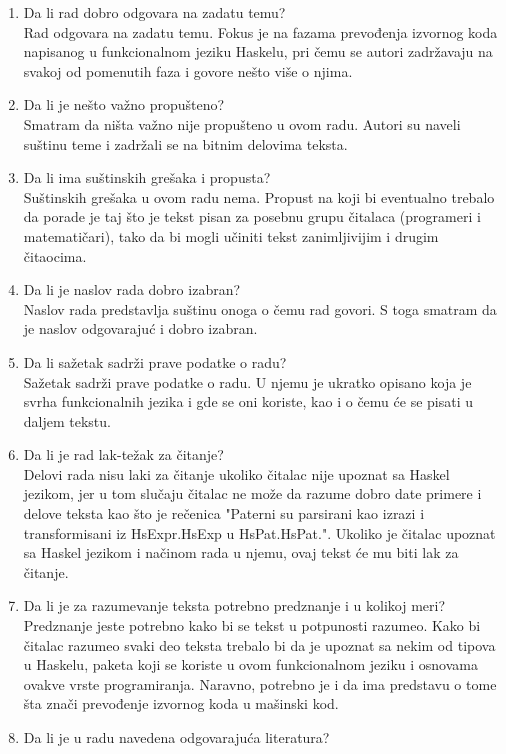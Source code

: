 \documentclass[a4paper]{report}
\begin{document}
	\begin{enumerate}
		\item Da li rad dobro odgovara na zadatu temu?\\
		Rad odgovara na zadatu temu. Fokus je na fazama prevođenja izvornog koda napisanog u funkcionalnom jeziku Haskelu, pri čemu se autori zadržavaju na svakoj od pomenutih faza i govore nešto više o njima.
		\item Da li je nešto važno propušteno?\\
		Smatram da ništa važno nije propušteno u ovom radu. Autori su naveli suštinu teme i zadržali se na bitnim delovima teksta.
		\item Da li ima suštinskih grešaka i propusta?\\
		Suštinskih grešaka u ovom radu nema. Propust na koji bi eventualno trebalo da porade je taj što je tekst pisan za posebnu grupu čitalaca (programeri i matematičari), tako da bi mogli učiniti tekst zanimljivijim i drugim čitaocima.
		\item Da li je naslov rada dobro izabran?\\
		Naslov rada predstavlja suštinu onoga o čemu rad govori. S toga smatram da je naslov odgovarajuć i dobro izabran.
		\item Da li sažetak sadrži prave podatke o radu?\\
		Sažetak sadrži prave podatke o radu. U njemu je ukratko opisano koja je svrha funkcionalnih jezika i gde se oni koriste, kao i o čemu će se pisati u daljem tekstu.
		\item Da li je rad lak-težak za čitanje?\\
		Delovi rada nisu laki za čitanje ukoliko čitalac nije upoznat sa Haskel jezikom, jer u tom slučaju čitalac ne može da razume dobro date primere i delove teksta kao što je rečenica "Paterni su parsirani kao izrazi i transformisani iz HsExpr.HsExp u
		HsPat.HsPat.". Ukoliko je čitalac upoznat sa Haskel jezikom i načinom rada u njemu, ovaj tekst će mu biti lak za čitanje.
		\item Da li je za razumevanje teksta potrebno predznanje i u kolikoj meri?\\
		Predznanje jeste potrebno kako bi se tekst u potpunosti razumeo. Kako bi čitalac razumeo svaki deo teksta trebalo bi da je upoznat sa nekim od tipova u Haskelu, paketa koji se koriste u ovom funkcionalnom jeziku i osnovama ovakve vrste programiranja. Naravno, potrebno je i da ima predstavu o tome šta znači prevođenje izvornog koda u mašinski kod.
		\item Da li je u radu navedena odgovarajuća literatura?\\

\end{enumerate}
\end{document}
